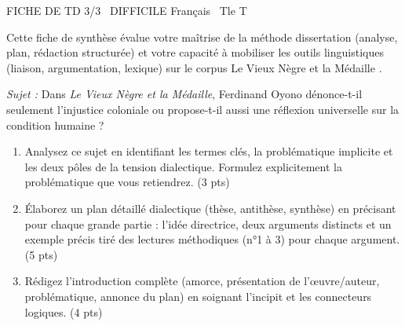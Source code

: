 \documentclass[11pt]{article}
\begin{document}
\begin{tcolorbox}[enhanced,colback=popink,colframe=popink,arc=10pt,boxrule=0pt,left=12pt,right=12pt,top=9pt,bottom=9pt]
{\color{white}\popxbold\small FICHE DE TD 3/3 \textbullet\ DIFFICILE \hfill Français \textbullet\ Tle T\par}
\end{tcolorbox}
\vspace{4pt}
\noindent Cette fiche de synthèse évalue votre maîtrise de la méthode dissertation (analyse, plan, rédaction structurée) et votre capacité à mobiliser les outils linguistiques (liaison, argumentation, lexique) sur le corpus \og Le Vieux Nègre et la Médaille \fg{}.

\begin{exercice}
\emph{Sujet :} \og Dans \textit{Le Vieux Nègre et la Médaille}, Ferdinand Oyono dénonce-t-il seulement l'injustice coloniale ou propose-t-il aussi une réflexion universelle sur la condition humaine ? \fg{}

\begin{enumerate}
    \item Analysez ce sujet en identifiant les termes clés, la problématique implicite et les deux pôles de la tension dialectique. Formulez explicitement la problématique que vous retiendrez. (3 pts)
    \item Élaborez un plan détaillé dialectique (thèse, antithèse, synthèse) en précisant pour chaque grande partie : l'idée directrice, deux arguments distincts et un exemple précis tiré des lectures méthodiques (n°1 à 3) pour chaque argument. (5 pts)
    \item Rédigez l'introduction complète (amorce, présentation de l'œuvre/auteur, problématique, annonce du plan) en soignant l'incipit et les connecteurs logiques. (4 pts)
\end{enumerate}
\end{exercice}
\end{document}
